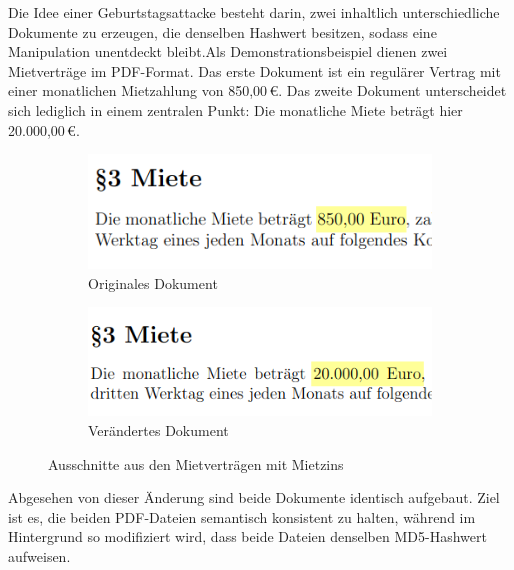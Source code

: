 Die Idee einer Geburtstagsattacke besteht darin, zwei inhaltlich unterschiedliche 
Dokumente zu erzeugen, die denselben Hashwert besitzen, sodass eine Manipulation 
unentdeckt bleibt.Als Demonstrationsbeispiel dienen zwei Mietverträge im PDF-Format. 
Das erste Dokument ist ein regulärer Vertrag mit einer monatlichen Mietzahlung von 
850,00\,€. Das zweite Dokument unterscheidet sich lediglich in einem 
zentralen Punkt: Die monatliche Miete beträgt hier 20.000,00\,€.
\begin{figure}[h]
    \centering
    \begin{subfigure}[b]{0.4\textwidth}
        \centering
        \includegraphics[width=\textwidth]{img/miete_org}
        \caption{Originales Dokument}
    \end{subfigure}
    \hfill
    \begin{subfigure}[b]{0.4\textwidth}
        \centering
        \includegraphics[width=\textwidth]{img/miete_chg}
        \caption{Verändertes Dokument}
    \end{subfigure}
    \caption{Ausschnitte aus den Mietverträgen mit Mietzins}
    \label{fig:mietvertraege}
\end{figure}
Abgesehen von dieser Änderung sind beide Dokumente identisch aufgebaut.
Ziel ist es, die beiden PDF-Dateien semantisch konsistent zu halten, während 
im Hintergrund so modifiziert wird, dass beide Dateien denselben MD5-Hashwert aufweisen.
